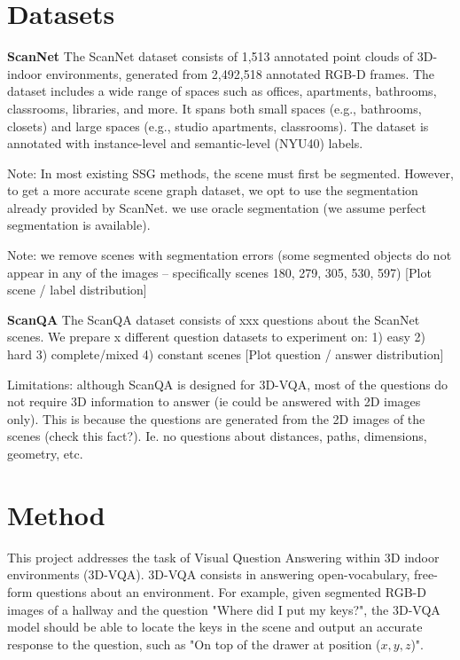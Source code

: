 \newpage
\chapter{Datasets}
\textbf{ScanNet}
The ScanNet dataset consists of 1,513 annotated point clouds of 3D-indoor environments, generated from 2,492,518 annotated RGB-D frames. The dataset includes a wide range of spaces such as offices, apartments, bathrooms, classrooms, libraries, and more. It spans both small spaces (e.g., bathrooms, closets) and large spaces (e.g., studio apartments, classrooms). The dataset is annotated with instance-level and semantic-level (NYU40) labels.

Note: In most existing SSG methods, the scene must first be segmented. However, to get a more accurate scene graph dataset, we opt to use the segmentation already provided by ScanNet. we use oracle segmentation (we assume perfect segmentation is available).

Note: we remove scenes with segmentation errors (some segmented objects do not appear in any of the images -- specifically scenes 180, 279, 305, 530, 597)
[Plot scene / label distribution]

\noindent
\textbf{ScanQA}
The ScanQA dataset consists of xxx questions about the ScanNet scenes.
We prepare x different question datasets to experiment on: 1) easy 2) hard 3) complete/mixed 4) constant scenes
[Plot question / answer distribution]

Limitations: although ScanQA is designed for 3D-VQA, most of the questions do not require 3D information to answer (ie could be answered with 2D images only). This is because the questions are generated from the 2D images of the scenes (check this fact?). Ie. no questions about distances, paths, dimensions, geometry, etc.

\newpage
\chapter{Method}

This project addresses the task of Visual Question Answering within 3D indoor environments (3D-VQA). 3D-VQA consists in answering open-vocabulary, free-form questions about an environment. For example, given segmented RGB-D images of a hallway and the question "Where did I put my keys?", the 3D-VQA model should be able to locate the keys in the scene and output an accurate response to the question, such as "On top of the drawer at position ($x, y, z$)".


